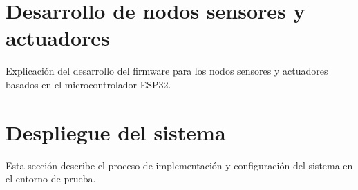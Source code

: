 \section{Desarrollo de nodos sensores y actuadores}

Explicación del desarrollo del firmware para los nodos sensores y actuadores
basados en el microcontrolador ESP32.

\section{Despliegue del sistema}

Esta sección describe el proceso de implementación y configuración del sistema
en el entorno de prueba.